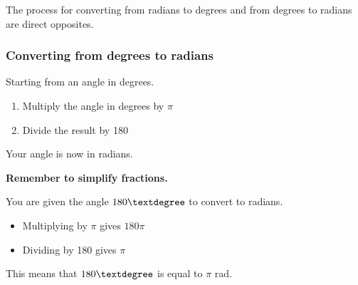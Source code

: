 \documentclass[
  12pt,
  a4paper, oneside]{starmastarticle}
\providecommand{\tightlist}{%
  \setlength{\itemsep}{0pt}\setlength{\parskip}{0pt}}\usepackage{longtable,booktabs,array}
\begin{document}
The process for converting from radians to degrees and from degrees to
radians are direct opposites.

\hypertarget{converting-from-degrees-to-radians}{%
\subsubsection{Converting from degrees to
radians}\label{converting-from-degrees-to-radians}}

Starting from an angle in degrees.

\begin{enumerate}
\def\labelenumi{\arabic{enumi}.}
\tightlist
\item
  Multiply the angle in degrees by \(\pi\)
\item
  Divide the result by 180
\end{enumerate}

Your angle is now in radians.

\begin{tcolorbox}[enhanced jigsaw, bottomrule=.15mm, rightrule=.15mm, breakable, leftrule=.75mm, opacityback=0, colbacktitle=quarto-callout-warning-color!10!white, title=\textcolor{quarto-callout-warning-color}{\faExclamationTriangle}\hspace{0.5em}{Warning}, arc=.35mm, toprule=.15mm, bottomtitle=1mm, left=2mm, colframe=quarto-callout-warning-color-frame, toptitle=1mm, titlerule=0mm, coltitle=black, opacitybacktitle=0.6, colback=white]
\textbf{Remember to simplify fractions.}
\end{tcolorbox}

\begin{tcolorbox}[enhanced jigsaw, bottomrule=.15mm, rightrule=.15mm, breakable, left=2mm, colframe=quarto-callout-note-color-frame, arc=.35mm, toprule=.15mm, colback=white, leftrule=.75mm, opacityback=0]
\begin{minipage}[t]{5.5mm}
\textcolor{quarto-callout-note-color}{\faInfo}
\end{minipage}%
\begin{minipage}[t]{\textwidth - 5.5mm}
You are given the angle \(180\textdegree\) to convert to radians.

\begin{itemize}
\tightlist
\item
  Multiplying by \(\pi\) gives \(180\pi\)
\item
  Dividing by 180 gives \(\pi\)
\end{itemize}

This means that \(180\textdegree\) is equal to \(\pi\)
rad.\end{minipage}%
\end{tcolorbox}
\end{document}
